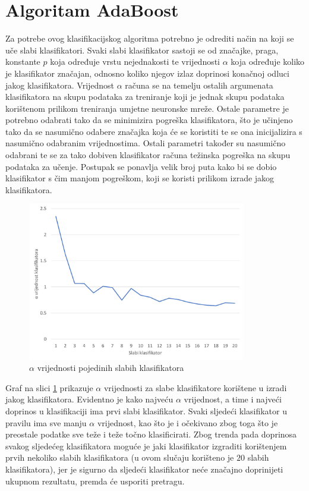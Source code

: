 \documentclass[times, utf8, zavrsni, numeric]{fer}
\begin{document}
\section{Algoritam AdaBoost}
Za potrebe ovog klasifikacijskog algoritma potrebno je odrediti način na koji se uče slabi klasifikatori.
Svaki slabi klasifikator sastoji se od značajke, praga, konstante $p$ koja određuje vrstu nejednakosti te vrijednosti $\alpha$ koja određuje koliko je klasifikator značajan, odnosno koliko njegov izlaz doprinosi konačnoj odluci jakog klasifikatora.
Vrijednost $\alpha$ računa se na temelju ostalih argumenata klasifikatora na skupu podataka za treniranje koji je jednak skupu podataka korištenom prilikom treniranja umjetne neuronske mreže.
Ostale parametre je potrebno odabrati tako da se minimizira pogreška klasifikatora, što je učinjeno tako da se nasumično odabere značajka koja će se koristiti te se ona inicijalizira s nasumično odabranim vrijednostima.
Ostali parametri također su nasumično odabrani te se za tako dobiven klasifikator računa težinska pogreška na skupu podataka za učenje.
Postupak se ponavlja velik broj puta kako bi se dobio klasifikator s čim manjom pogreškom, koji se koristi prilikom izrade jakog klasifikatora.
\begin{figure}[ht!]
    \centering
    \includegraphics[width=0.85\textwidth]{Images/Ada.pdf}
    \captionsetup{justification=centering}
    \caption{$\alpha$ vrijednosti pojedinih slabih klasifikatora}
    \label{fig:ada}
\end{figure}

Graf na slici \ref{fig:ada} prikazuje $\alpha$ vrijednosti za slabe klasifikatore korištene u izradi jakog klasifikatora. 
Evidentno je kako najveću $\alpha$ vrijednost, a time i najveći doprinos u klasifikaciji ima prvi slabi klasifikator. 
Svaki sljedeći klasifikator u pravilu ima sve manju $\alpha$ vrijednost, kao što je i očekivano zbog toga što je preostale podatke sve teže i teže točno klasificirati. 
Zbog trenda pada doprinosa svakog sljedećeg klasifikatora moguće je jaki klasifikator izgraditi korištenjem prvih nekoliko slabih klasifikatora (u ovom slučaju korišteno je $20$ slabih klasifikatora), jer je sigurno da sljedeći klasifikator neće značajno doprinijeti ukupnom rezultatu, premda će usporiti pretragu.
\end{document}
